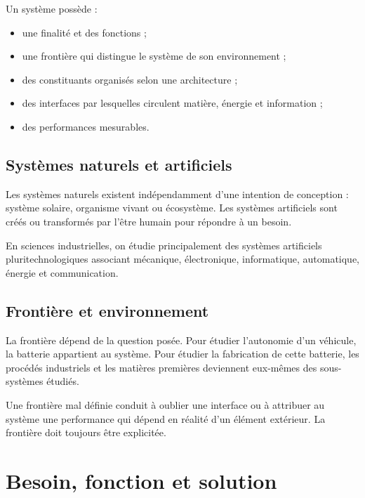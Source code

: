 Un système possède :
\begin{itemize}
  \item une finalité et des fonctions ;
  \item une frontière qui distingue le système de son environnement ;
  \item des constituants organisés selon une architecture ;
  \item des interfaces par lesquelles circulent matière, énergie et information ;
  \item des performances mesurables.
\end{itemize}

\ISSystemeBoiteNoire

\subsection{Systèmes naturels et artificiels}

Les systèmes naturels existent indépendamment d'une intention de conception : système solaire, organisme vivant ou écosystème. Les systèmes artificiels sont créés ou transformés par l'être humain pour répondre à un besoin.

En sciences industrielles, on étudie principalement des systèmes artificiels pluritechnologiques associant mécanique, électronique, informatique, automatique, énergie et communication.

\subsection{Frontière et environnement}

La frontière dépend de la question posée. Pour étudier l'autonomie d'un véhicule, la batterie appartient au système. Pour étudier la fabrication de cette batterie, les procédés industriels et les matières premières deviennent eux-mêmes des sous-systèmes étudiés.

\ISContexte

\begin{ISattention}
Une frontière mal définie conduit à oublier une interface ou à attribuer au système une performance qui dépend en réalité d'un élément extérieur. La frontière doit toujours être explicitée.
\end{ISattention}

\section{Besoin, fonction et solution}\label{sec:is-besoin}

